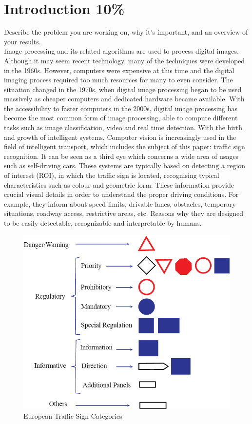 \section{Introduction 10\%}
Describe the problem you are working on, why it's important, and an overview of your results.\\
Image processing and its related algorithms are used to process digital images. Although it may seem recent technology, many of the techniques were developed in the 1960s. However, computers were expensive at this time and the digital imaging process required too much resources for many to even consider. The situation changed in the 1970s, when digital image processing began to be used massively as cheaper computers and dedicated hardware became available. With the accessibility to faster computers in the 2000s, digital image processing has become the most common form of image processing, able to compute different tasks such as image classification, video and real time detection. With the birth and growth of intelligent systems, Computer vision is increasingly used in the field of intelligent transport, which includes the subject of this paper: traffic sign recognition. It can be seen as a third eye which concerns a wide area of usages such as self-driving cars. These systems are typically based on detecting a region of interest (ROI), in which the traffic sign is located, recognising typical characteristics such as colour and geometric form. These information provide crucial visual details in order to understand the proper driving conditions. For example, they inform about speed limits, drivable lanes, obstacles, temporary situations, roadway access, restrictive areas, etc. Reasons why they are designed to be easily detectable, recognizable and interpretable by humans.
\begin{figure}[h]
	\includegraphics[width=\linewidth]{Res/Immagini/european-traffic-signs.PNG}	
	\caption{European Traffic Sign Categories}
\end{figure}


